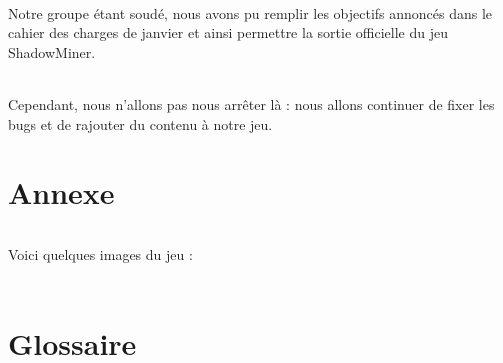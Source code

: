 \documentclass[titlepage, 13px, a4paper]{report}
\begin{document}
\paragraph{} \hspace{0pt}
Notre groupe étant soudé, nous avons pu remplir les objectifs annoncés dans le cahier des 
charges de janvier et ainsi permettre la sortie officielle du jeu ShadowMiner. \\

\paragraph{} \hspace{0pt}
Cependant, nous n’allons pas nous arrêter là : nous allons continuer de fixer les bugs 
et de rajouter du contenu à notre jeu. \\



\newpage

\newpage


\part{Annexe}
\paragraph{} \hspace{0pt}
Voici quelques images du jeu : \\ \\




\part{Glossaire}
\paragraph{} \hspace{0pt}


\end{document}
